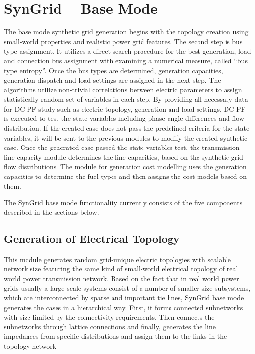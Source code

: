 \documentclass[12pt]{article}
\newcommand{\syngrid}[0]{{SynGrid}}
\numberwithin{equation}{section}
\numberwithin{table}{section}
\numberwithin{figure}{section}
\begin{document}
\clearpage
\section{\syngrid{} -- Base Mode}
\label{sec:syngrid_base}


The base mode synthetic grid generation begins with the topology creation using small-world properties and realistic power grid features. The second step is bus type assignment. It utilizes a direct search procedure for the best generation, load and connection bus assignment with examining a numerical measure, called ``bus type entropy''. Once the bus types are determined, generation capacities, generation dispatch and load settings are assigned in the next step. The algorithms utilize non-trivial correlations between electric parameters to assign statistically random set of variables in each step. By providing all necessary data for DC PF study such as electric topology, generation and load settings, DC PF is executed to test the state variables including phase angle differences and flow distribution. If the created case does not pass the predefined criteria for the state variables, it will be sent to the previous modules to modify the created synthetic case. Once the generated case passed the state variables test, the transmission line capacity module determines the line capacities, based on the synthetic grid flow distributions. The module for generation cost modelling uses the generation capacities to determine the fuel types and then assigns the cost models based on them.

The \syngrid{} base mode functionality currently consists of the five components described in the sections below.


\subsection{Generation of Electrical Topology}
\label{sec:Basemode}


This module generates random grid-unique electric topologies with scalable network size featuring the same kind of small-world electrical topology of real world power transmission network. Based on the fact that in real world power grids usually a large-scale systems consist of a number of smaller-size subsystems, which are interconnected by sparse and important tie lines, \syngrid{} base mode generates the cases in a hierarchical way. First, it forms connected subnetworks with size limited by the connectivity requirements. Then connects the subnetworks through lattice connections and finally, generates the line impedances from specific distributions and assign them to the links in the topology network.
\end{document}
